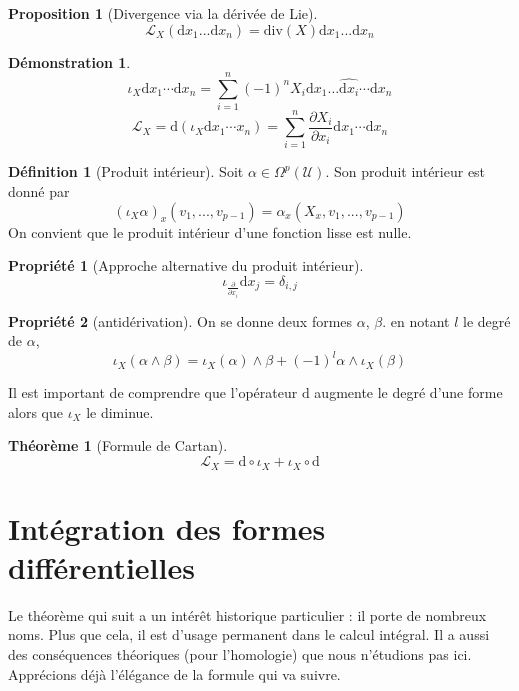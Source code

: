 \documentclass{article}
\theoremstyle{definition} %
\newtheorem{defi}{Définition}
\newtheorem{thm}{Théorème}
\newtheorem{prop}{Proposition}
\newtheorem{dem}{Démonstration}
\newtheorem{propri}{Propriété}
\newcommand{\derp}[2]{\frac{\partial {#1}}{\partial {#2}}}
\newcommand{\rond}{\circ}
\newcommand{\dd}{ \mathrm{d}}
\newcommand{\1}{\mathbb{1}} %
\newcommand{\loi}{\mathcal{L}} %
\begin{document}
\begin{prop}[Divergence via la dérivée de Lie]
$$\loi_X (\dd x_1 ... \dd x_n) = \mathrm{div} (X) \dd x_1 ... \dd x_n$$
\end{prop}

\begin{dem}
$$ \iota_X \dd x_1\cdots \dd x_n=\sum_{i=1}^{n}(-1)^nX_i\dd x_1\ldots\widehat{\dd{x_i}} \cdots\dd x_n$$
$$\mathcal{L}_X=\dd(\iota_X \dd x_1 \cdots x_n)=\sum_{i=1}^n\frac{\partial X_i}{\partial x_i}\dd x_1\cdots\dd x_n$$


\end{dem}

\begin{defi}[Produit intérieur]
    Soit $\alpha \in \Omega^p (\mathcal{U})$. Son produit intérieur est donné par
    $$(\iota_X \alpha)_x (v_1, ..., v_{p-1})= \alpha_x (X_x,v_1,...,v_{p-1})$$
    On convient que le produit intérieur d'une fonction lisse est nulle.
\end{defi}

\begin{propri}[Approche alternative du produit intérieur]
$$\iota_{\derp{}{x_i}} \dd x_j = \delta_{i,j}$$
\end{propri}

\begin{propri}[antidérivation]
On se donne deux formes $\alpha$, $\beta$. en notant $l$ le degré de $\alpha$,
$$ \iota_X ( \alpha \wedge \beta )= \iota_X (\alpha) \wedge \beta + (-1)^l \alpha \wedge \iota_X (\beta)$$
\end{propri}

Il est important de comprendre que l'opérateur $\dd$ augmente le degré d'une forme alors que $\iota_X$ le diminue.


\begin{thm}[Formule de Cartan]
    $$\loi_X = \dd \rond \iota_X + \iota_X \rond \dd$$
\end{thm}



\section{Intégration des formes différentielles}

Le théorème qui suit a un intérêt historique particulier : il porte de nombreux noms. Plus que cela, il est d'usage permanent dans le calcul intégral. 
Il a aussi des conséquences théoriques (pour l'homologie) que nous n'étudions pas ici.
Apprécions déjà l'élégance de la formule qui va suivre.
\end{document}
